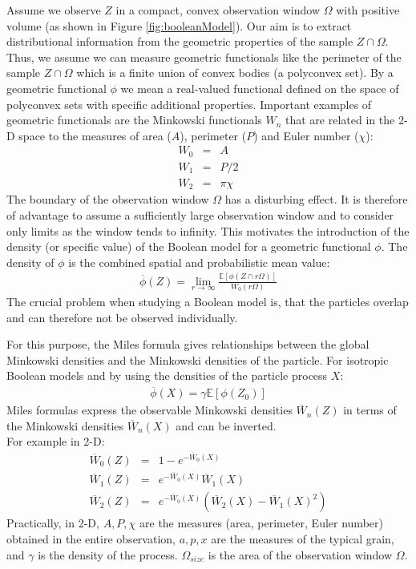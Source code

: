 Assume we observe $Z$ in a compact, convex observation window $\Omega$ with positive volume (as shown in Figure \ref{fig:booleanModel}).
Our aim is to extract distributional information from the geometric properties of the sample $Z \cap \Omega$. Thus, we assume we can measure geometric functionals like the perimeter of the sample $Z \cap \Omega$ which is a finite union of convex bodies (a polyconvex set). By a geometric functional $\phi$ we mean a real-valued functional defined on the space of polyconvex sets with specific additional properties. Important examples of geometric functionals are the Minkowski functionals $W_{n}$ that are related in the 2-D space to the measures of area ($A$), perimeter ($P$) and Euler number ($\chi$):
\begin{eqnarray}
W_0&=&A\\
W_1&=&P/2\\
W_2&=&\pi \chi
\end{eqnarray}
%
The boundary of the observation window $\Omega$ has a disturbing effect. It is therefore of advantage to assume a sufficiently large observation
window and to consider only limits as the window tends to infinity. This motivates the introduction of the density (or specific value) of the Boolean model for a geometric functional $\phi$. The density of $\phi$ is the combined spatial and probabilistic mean value:\vspace*{-8pt}
\begin{eqnarray}
\overline{\phi}(Z)=\lim_{r\rightarrow\infty}\frac{\mathbb{E}[\phi(Z\cap r\Omega)]}{W_0(r\Omega)}
\end{eqnarray}
The crucial problem when studying a Boolean model is, that the particles overlap and can therefore not be observed individually.

For this purpose, the Miles formula gives relationships between the global Minkowski densities and the Minkowski densities of the particle.
For isotropic Boolean models and by using the densities of the particle process $X$:
\begin{eqnarray}
\overline{\phi}(X)=\gamma\mathbb{E}[\phi(Z_0)]
\end{eqnarray}
Miles formulas express the observable Minkowski densities $\overline{W}_{n}(Z)$ in terms of the Minkowski densities $\overline{W}_{n}(X)$ and can be inverted.\\
For example in 2-D: \vspace*{-8pt}
\begin{eqnarray}
\overline{W}_0(Z)&=&1-e^{-\overline{W}_0(X)}\\
\overline{W}_1(Z)&=&e^{-\overline{W}_0(X)}\overline{W}_1(X)\label{eq:miles2}\\
\overline{W}_2(Z)&=&e^{-\overline{W}_0(X)}\left(\overline{W}_2(X)-\overline{W}_1(X)^2\right)\label{eq:miles3}
\end{eqnarray}
Practically, in 2-D, $A,P,\chi$ are the measures (area, perimeter, Euler number) obtained in the entire observation, $a,p,x$ are the measures of the typical grain, and $\gamma$ is the density of the process. $\Omega_{size}$ is the area of the observation window $\Omega$.

